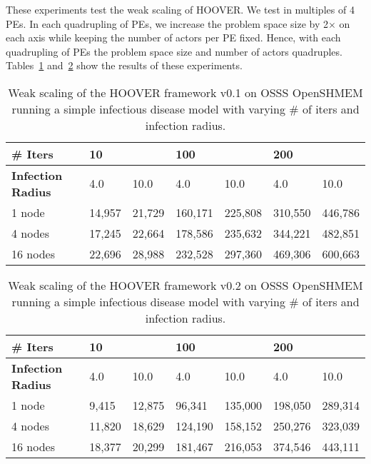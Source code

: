 These experiments test the weak scaling of HOOVER. We test in multiples of 4
PEs. In each quadrupling of PEs, we increase the problem space size by 2$\times$
on each axis while keeping the number of actors per PE fixed. Hence, with each
quadrupling of PEs the problem space size and number of actors quadruples.
Tables~\ref{tab:weak_scaling1} and~\ref{tab:weak_scaling2} show the results of these experiments.

\begin{table}
\centering
\begin{tabularx}{\textwidth}{ | l || X | X | X | X | X | X | }
\hline
\textbf{\# Iters}           & \multicolumn{2}{|X|}{\textbf{10}} & \multicolumn{2}{|X|}{\textbf{100}} & \multicolumn{2}{|X|}{\textbf{200}} \\\hline
\textbf{Infection Radius}   & 4.0          & 10.0         & 4.0           & 10.0          & 4.0           & 10.0 \\\hline
1 node                      & 14,957 & 21,729 & 160,171 & 225,808 & 310,550 & 446,786 \\\hline
4 nodes                     & 17,245 & 22,664 & 178,586 & 235,632 & 344,221 & 482,851 \\\hline
16 nodes                    & 22,696 & 28,988 & 232,528 & 297,360 & 469,306 & 600,663 \\\hline
\end{tabularx}
\caption{Weak scaling of the HOOVER framework v0.1 on OSSS OpenSHMEM running a
    simple infectious disease model with varying \# of iters and infection
    radius.}
\label{tab:weak_scaling1}
\end{table}

\begin{table}
\centering
\begin{tabularx}{\textwidth}{ | l || X | X | X | X | X | X | }
\hline
\textbf{\# Iters}           & \multicolumn{2}{|X|}{\textbf{10}} & \multicolumn{2}{|X|}{\textbf{100}} & \multicolumn{2}{|X|}{\textbf{200}} \\\hline
\textbf{Infection Radius}   & 4.0          & 10.0         & 4.0           & 10.0          & 4.0           & 10.0 \\\hline
1 node                      & 9,415  & 12,875 & 96,341  & 135,000 & 198,050 & 289,314 \\\hline
4 nodes                     & 11,820 & 18,629 & 124,190 & 158,152 & 250,276 & 323,039 \\\hline
16 nodes                    & 18,377 & 20,299 & 181,467 & 216,053 & 374,546 & 443,111 \\\hline
\end{tabularx}
\caption{Weak scaling of the HOOVER framework v0.2 on OSSS OpenSHMEM running a
    simple infectious disease model with varying \# of iters and infection
    radius.}
\label{tab:weak_scaling2}
\end{table}

